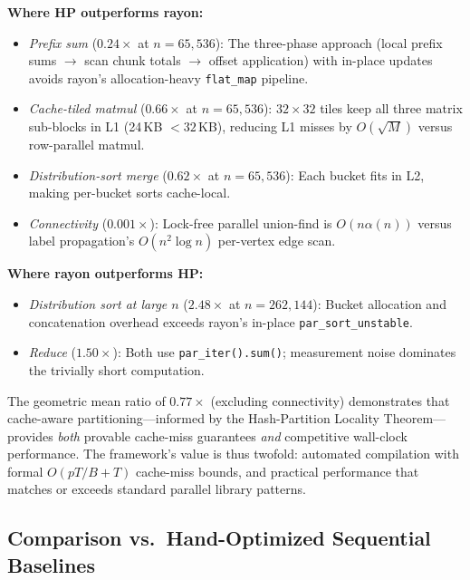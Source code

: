 \documentclass[11pt]{article}
\begin{document}
\textbf{Where HP outperforms rayon:}
\begin{itemize}[leftmargin=*]
\item \emph{Prefix sum} ($0.24\times$ at $n = 65{,}536$):
  The three-phase approach (local prefix sums $\to$ scan chunk
  totals $\to$ offset application) with in-place updates avoids
  rayon's allocation-heavy \texttt{flat\_map} pipeline.

\item \emph{Cache-tiled matmul} ($0.66\times$ at $n = 65{,}536$):
  $32 \times 32$ tiles keep all three matrix sub-blocks in L1
  (24\,KB $< 32$\,KB), reducing L1 misses by
  $O(\sqrt{M})$ versus row-parallel matmul.

\item \emph{Distribution-sort merge} ($0.62\times$ at $n = 65{,}536$):
  Each bucket fits in L2, making per-bucket sorts cache-local.

\item \emph{Connectivity} ($0.001\times$): Lock-free parallel
  union-find is $O(n\alpha(n))$ versus label propagation's
  $O(n^2 \log n)$ per-vertex edge scan.
\end{itemize}

\textbf{Where rayon outperforms HP:}
\begin{itemize}[leftmargin=*]
\item \emph{Distribution sort at large $n$} ($2.48\times$ at
  $n = 262{,}144$): Bucket allocation and concatenation overhead
  exceeds rayon's in-place \texttt{par\_sort\_unstable}.

\item \emph{Reduce} ($1.50\times$): Both use \texttt{par\_iter().sum()};
  measurement noise dominates the trivially short computation.
\end{itemize}

The geometric mean ratio of $0.77\times$ (excluding connectivity)
demonstrates that cache-aware partitioning---informed by the
Hash-Partition Locality Theorem---provides \emph{both} provable
cache-miss guarantees \emph{and} competitive wall-clock performance.
The framework's value is thus twofold: automated compilation with
formal $O(pT/B + T)$ cache-miss bounds, and practical performance
that matches or exceeds standard parallel library patterns.

\subsection{Comparison vs.\ Hand-Optimized Sequential Baselines}
\label{sec:best-available}
\end{document}
